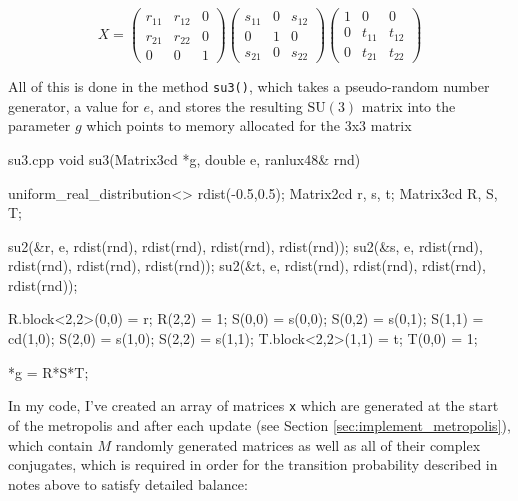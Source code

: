 \documentclass[11pt]{article}
\begin{document}
\begin{equation}X=\begin{pmatrix}r_{11}&r_{12}&0\\r_{21}&r_{22}&0\\0&0&1\end{pmatrix}\begin{pmatrix}s_{11}&0&s_{12}\\0&1&0\\s_{21}&0&s_{22}\end{pmatrix}\begin{pmatrix}1&0&0\\0&t_{11}&t_{12}\\0&t_{21}&t_{22}\end{pmatrix}\end{equation}

All of this is done in the method \lstinline{su3()}, which takes a pseudo-random number generator, a value for $e$, and stores the resulting $\mathrm{SU}(3)$ matrix into the parameter $g$ which points to memory allocated for the 3x3 matrix 

\begin{center}
\begin{minipage}{0.91\linewidth}
\begin{code}{su3.cpp}
void su3(Matrix3cd *g, double e, ranlux48& rnd){
        uniform_real_distribution<> rdist(-0.5,0.5);
        Matrix2cd r, s, t;
        Matrix3cd R, S, T;

        su2(&r, e, rdist(rnd), rdist(rnd), rdist(rnd), rdist(rnd));
        su2(&s, e, rdist(rnd), rdist(rnd), rdist(rnd), rdist(rnd));
        su2(&t, e, rdist(rnd), rdist(rnd), rdist(rnd), rdist(rnd));

        R.block<2,2>(0,0) = r; R(2,2) = 1;
        S(0,0) = s(0,0); S(0,2) = s(0,1); S(1,1) = cd(1,0); S(2,0) = s(1,0); S(2,2) = s(1,1);
        T.block<2,2>(1,1) = t; T(0,0) = 1;

        *g = R*S*T;
}
\end{code}
\end{minipage}
\end{center}

In my code, I've created an array of matrices \lstinline{x} which are generated at the start of the metropolis and after each update (see Section \ref{sec:implement_metropolis}), which contain $M$ randomly generated matrices as well as all of their complex conjugates, which is required in order for the transition probability described in notes above to satisfy detailed balance:
\end{document}
